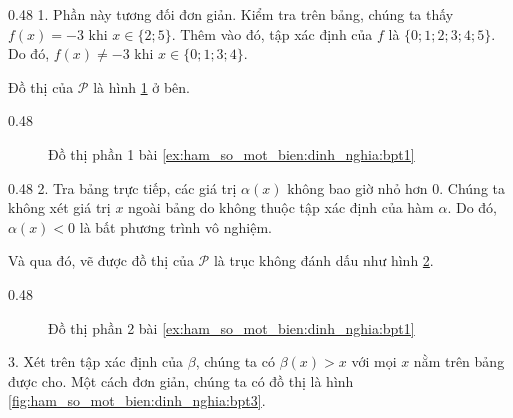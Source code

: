{
   \begin{minipageindent}{0.48\textwidth}
      1. Phần này tương đối đơn giản. Kiểm tra trên bảng, chúng ta thấy $f(x) = -3$ khi $x \in \{2; 5\}$. Thêm vào đó, tập xác định của $f$ là $\{0; 1; 2; 3; 4; 5\}$. Do đó, $f(x) \neq -3$ khi $x \in \{0; 1; 3; 4\}$. 

      Đồ thị của $\mathcal{P}$ là hình \ref{fig:ham_so_mot_bien:dinh_nghia:bpt1} ở bên.
   \end{minipageindent}
   \begin{minipageindent}{0.48\textwidth}
      \begin{figure}[H]
         \centering
         \caption{Đồ thị phần 1 bài \ref{ex:ham_so_mot_bien:dinh_nghia:bpt1}}
         \label{fig:ham_so_mot_bien:dinh_nghia:bpt1}
      \end{figure}
   \end{minipageindent}
}

{
   \begin{minipageindent}{0.48\textwidth}
      2. Tra bảng trực tiếp, các giá trị $\alpha(x)$ không bao giờ nhỏ hơn $0$. Chúng ta không xét giá trị $x$ ngoài bảng do không thuộc tập xác định của hàm $\alpha$. Do đó, $\alpha(x) < 0$ là bất phương trình vô nghiệm.

      Và qua đó, vẽ được đồ thị của $\mathcal{P}$ là trục không đánh dấu như hình \ref{fig:ham_so_mot_bien:dinh_nghia:bpt2}.
   \end{minipageindent}
   \begin{minipageindent}{0.48\textwidth}
      \begin{figure}[H]
         \centering
         \caption{Đồ thị phần 2 bài \ref{ex:ham_so_mot_bien:dinh_nghia:bpt1}}
         \label{fig:ham_so_mot_bien:dinh_nghia:bpt2}
      \end{figure}
   \end{minipageindent}
}

3. Xét trên tập xác định của $\beta$, chúng ta có $\beta(x) > x$ với mọi $x$ nằm trên bảng được cho. Một cách đơn giản, chúng ta có đồ thị là hình \ref{fig:ham_so_mot_bien:dinh_nghia:bpt3}.

